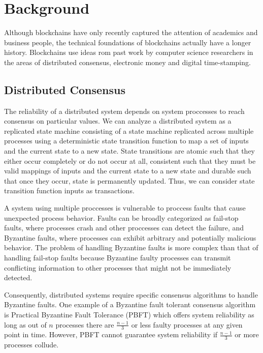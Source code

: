 \section{Background}

Although blockchains have only recently captured the attention of academics and
business people, the technical foundations of blockchains actually have a longer
history. Blockchains use ideas rom past work by computer science
researchers in the areas of distributed consensus, electronic money
and digital time-stamping.

\subsection{Distributed Consensus}

The reliability of a distributed system depends on system proccesses to
reach consensus on particular values. We can analyze a distributed system as a
replicated state machine consisting of a state machine replicated across
multiple processes using a deterministic state transition function to map a set
of inputs and the current state to a new state\cite{faulttolerant}. State
transitions are atomic such that they either occur completely or do not occur at
all, consistent such that they must be valid mappings of inputs and the current
state to a new state and durable such that once they occur, state is permanently
updated. Thus, we can consider state transition function inputs as transactions\cite{transactions}.

A system using multiple proccesses is vulnerable to proccess faults that cause
unexpected process behavior. Faults can be broadly categorized as fail-stop
faults, where processes crash and other proccesses can detect the failure, and
Byzantine faults, where processes can exhibit arbitrary and potentially
malicious behavior\cite{faulttolerant}. The problem of handling Byzantine faults
is more complex than that of handling fail-stop faults because Byzantine faulty
processes can transmit conflicting information to other processes that might
not be immediately detected\cite{byzantine}.

Consequently, distributed systems require specific consensus algorithms to
handle Byzantine faults. One example of a Byzantine fault tolerant consensus
algorithm is Practical Byzantine Fault Tolerance (PBFT) which offers system
reliability as long as out of $n$ processes there are $\frac{n - 1}{3}$ or less
faulty processes at any given point in time\cite{pbft}. However, PBFT cannot
guarantee system reliability if $\frac{n - 1}{3}$ or more processes collude.

